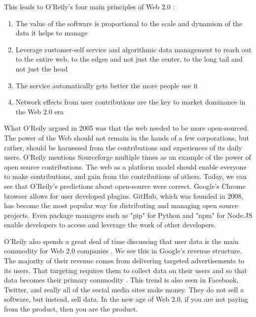 \documentclass[12pt]{article}
\begin{document}
This leads to O'Reily's four main principles of Web 2.0 \cite{what_is_web2}:
\begin{enumerate}
  \item{The value of the software is proportional to the scale and dynamism of the data it helps to manage}
  \item{Leverage customer-self service and algorithmic data management to reach out to the entire web, to the edges and not just the center, to the long tail and not just the head}
  \item{The service automatically gets better the more people use it}
  \item{Network effects from user contributions are the key to market dominance in the Web 2.0 era}
\end{enumerate}

What O'Reily argued in 2005 was that the web needed to be more open-sourced.  The power of the Web should not remain in the hands of a few corporations, but rather, should be harnessed from the contributions and experiences of its daily users.  O'Reily mentions Sourceforge multiple times as an example of the power of open source contributions.  The web as a platform model should enable everyone to make contributions, and gain from the contributions of others.  Today, we can see that O'Reily's predictions about open-source were correct.  Google's Chrome browser allows for user developed plugins.  GitHub, which was founded in 2008, has become the most popular way for distributing and managing open source projects.  Even package managers such as "pip" for Python and "npm" for Node.JS enable developers to access and leverage the work of other developers.

O'Reily also spends a great deal of time discussing that user data is the main commodity for Web 2.0 companies \cite{what_is_web2}.  We see this in Google's revenue structure.  The majority of their revenue comes from delivering targeted advertisements to its users.  That targeting requires them to collect data on their users and so that data becomes their primary commodity \cite{google_revenue}.  This trend is also seen in Facebook, Twitter, and really all of the social media sites make money.  They do not sell a software, but instead, sell data.  In the new age of Web 2.0, if you are not paying from the product, then you are the product\cite{social_media_revenue}.
\end{document}
